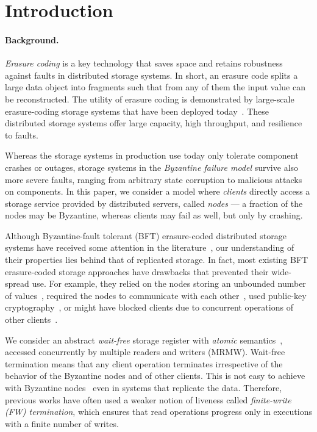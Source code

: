 \documentclass[oribibl]{llncs}
\theoremstyle{definition-boldhead}
\newcommand{\nodes}{nodes\xspace}
\begin{document}
\section{Introduction}

\paragraph{Background.}
\emph{Erasure coding} is a key technology that saves space and retains
robustness against faults in distributed storage systems. In short, an
erasure code splits a large data object into  fragments such that
from any  of them the input value can be reconstructed. The utility
of erasure coding is demonstrated by large-scale erasure-coding
storage systems that have been deployed
today~\cite{hsxocg12,cleversafect13}. These distributed storage
systems offer large capacity, high throughput, and resilience to
faults.

Whereas the storage systems in production use today only tolerate
component crashes or outages, storage systems in the \emph{Byzantine
  failure model} survive also more severe faults, ranging from
arbitrary state corruption to malicious attacks on components. In this
paper, we consider a model where \emph{clients} directly access a
storage service provided by distributed servers, called \emph{\nodes}
--- a fraction of the \nodes may be Byzantine, whereas clients may
fail as well, but only by crashing.

Although Byzantine-fault tolerant (BFT) erasure-coded distributed
storage systems have received some attention in the
literature~\cite{gwgr04,cactes06,hegare07b,dugule08,bcqas11}, our
understanding of their properties lies behind that of replicated
storage. In fact, most existing BFT erasure-coded storage approaches have drawbacks that
prevented their wide-spread use.  For example, they relied on the
\nodes storing an unbounded number of values~\cite{gwgr04}, required
the \nodes to communicate with each other~\cite{cactes06}, used
public-key cryptography~\cite{cactes06,hegare07b}, or might have
blocked clients due to concurrent operations of other
clients~\cite{hegare07b}.

We consider an abstract \emph{wait-free} storage register with
\emph{atomic} semantics~\cite{herwin90}, accessed concurrently by
multiple readers and writers (MRMW).  Wait-free termination means that
any client operation terminates irrespective of the behavior of the
Byzantine \nodes and of other clients.  This is not easy to achieve
with Byzantine \nodes~\cite{ackm06} even in systems that replicate
the data.  Therefore, previous works have often used a weaker notion
of liveness called \emph{finite-write (FW) termination}, which ensures
that read operations progress only in executions with a finite number
of writes.
\end{document}
